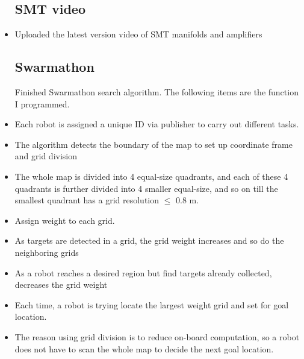 \begin{itemize}
\subsection{SMT video}
\item Uploaded the latest version video of SMT manifolds and amplifiers
\subsection{Swarmathon}
Finished Swarmathon search algorithm. The following items are the function I programmed. 
\item Each robot is assigned a unique ID via publisher to carry out different tasks.
\item The algorithm detects the boundary of the map to set up coordinate frame and grid division
\item The whole map is divided into 4 equal-size quadrants, and each of these 4 quadrants is further divided into 4 smaller equal-size, and so on till the smallest quadrant has a grid resolution $\le$ 0.8 m.
\item Assign weight to each grid.
\item As targets are detected in a grid, the grid weight increases and so do the neighboring grids
\item As a robot reaches a desired region but find targets already collected, decreases the grid weight
\item Each time, a robot is trying locate the largest weight grid and set for goal location.
\item The reason using grid division is to reduce on-board computation, so a robot does not have to scan the whole map to decide the next goal location.
   



\end{itemize}

%




